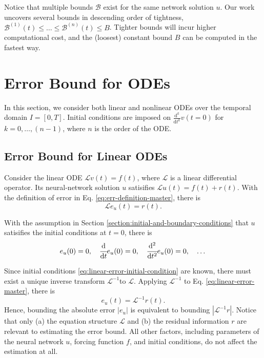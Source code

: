 \documentclass[accepted]{uai2023}
\newcommand{\dt}[1]{\cfrac{\mathrm{d} #1}{\mathrm{d} t}}
\newcommand{\dnt}[2]{\cfrac{\mathrm{d}^{#1} #2}{\mathrm{d} t^{#1}}}
\newcommand{\Err}{e}
\newcommand{\Bound}{\mathcal{B}}
\renewcommand{\L}{\mathcal{L}}
\begin{document}
    Notice that multiple bounds $\Bound$ exist for the same network solution $u$.
    Our work uncovers several bounds in descending order of tightness, $\Bound^{(1)}(t) \leq \dots \leq \Bound^{(n)}(t) \leq B$. Tighter bounds will incur higher computational cost, and the (loosest) constant bound $B$ can be computed in the fastest way.


\section{Error Bound for ODEs}
    In this section, we consider both linear and nonlinear ODEs over the temporal domain $I=[0, T]$. 
    Initial conditions are imposed on $\frac{\mathrm{d}^k}{\mathrm{d}t^k}v(t=0)$ for $k = 0, \dots, (n - 1)$, where $n$ is the order of the ODE.

\subsection{Error Bound for Linear ODEs}\label{section:error-bound-for-linear-odes}
    Consider the linear ODE $\L v(t) = f(t)$, where $\L$ is a linear differential operator. 
    Its neural-network solution $u$ satisifies $\L u(t) = f(t) + r(t)$. 
    With the definition of error in Eq. \ref{eq:err-definition-master}, there is
    \begin{equation} \label{eq:linear-error-master}
        \L \Err_u(t) = r(t).
    \end{equation}

    With the assumption in Section \ref{section:initial-and-boundary-conditions} that $u$ satisifies the initial conditions at $t=0$, there is
    \begin{equation} \label{eq:linear-error-initial-condition}
        \Err_u(0) = 0, \quad \dt{}{}\Err_u(0) = 0, \quad \dnt{2}{}\Err_u(0) = 0, \quad \dots 
    \end{equation}

    Since initial conditions \ref{eq:linear-error-initial-condition} are known, there must exist a unique inverse transform $\L^{-1}$to $\L$.  Applying $\L^{-1}$ to Eq. \ref{eq:linear-error-master}, there is 
    \begin{equation}\label{eq:linear-error-inverse-master}
        \Err_u(t) = \L^{-1} r(t).
    \end{equation}
    Hence, bounding the absolute error $\left|\Err_u\right|$ is equivalent to bounding $\left|\L^{-1} r\right|$. 
    Notice that only (a) the equation structure $\L$ and (b) the residual information $r$ are relevant to estimating the error bound. 
    All other factors, including parameters of the neural network $u$, forcing function $f$, and initial conditions, do not affect the estimation at all.
\end{document}
